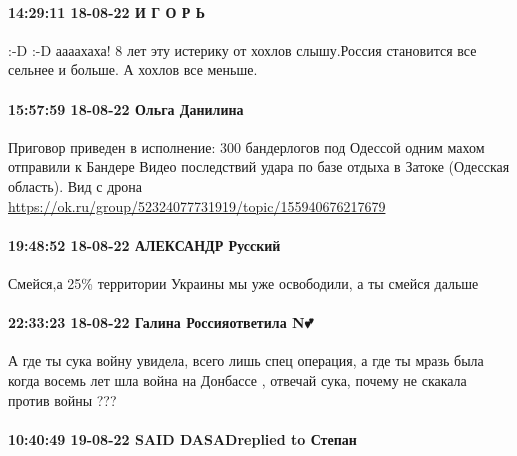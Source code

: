\paragraph{14:29:11 18-08-22 И Г О Р Ь}

:-D :-D аааахаха! 8 лет эту истерику от хохлов слышу.Россия становится все
сельнее и больше. А хохлов все меньше.

\paragraph{15:57:59 18-08-22 Ольга Данилина}

Приговор приведен в исполнение: 300 бандерлогов под Одессой одним махом
отправили к Бандере Видео последствий удара по базе отдыха в Затоке (Одесская
область). Вид с дрона
\underline{https://ok.ru/group/52324077731919/topic/155940676217679}

\paragraph{19:48:52 18-08-22 АЛЕКСАНДР Русский}

Смейся,а 25\% территории Украины мы уже освободили, а ты смейся дальше

\paragraph{22:33:23 18-08-22 Галина Россияответила N💕🌹}

А где ты сука войну увидела, всего лишь спец операция, а где ты мразь была
когда восемь лет шла война на Донбассе , отвечай сука, почему не скакала против
войны ???

\paragraph{10:40:49 19-08-22 SAID DASADreplied to Степан}

